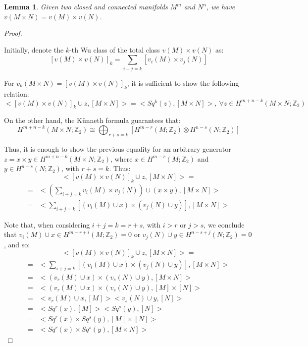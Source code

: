 \documentclass[12pt,oneside]{book}
\newtheorem{lem}    {Lemma}[chapter]
\newcommand{\Z}{\mathbb{Z}}
\begin{document}
    \begin{lem}
        Given two closed and connected manifolds $M^{m}$ and $N^{n}$, we have $v(M\times N)=v(M)\times v(N)$.
    \end{lem}
    \begin{proof}
    
    \
    
    Initially, denote the $k$-th Wu class of the total class $v(M)\times v(N)$ as:
    $$ [v(M)\times v(N)]_{k}=\sum_{i+j=k}\left[ v_{i}(M)\times v_{j}(N)\right] $$
    
    For $v_{k}(M\times N)=[v(M)\times v(N)]_{k}$, it is sufficient to show the following relation:
    $$ <[v(M)\times v(N)]_{k}\cup z,[M\times N]>=<Sq^{k}(z),[M\times N]>, \ \forall z\in H^{m+n-k}(M\times N;\Z_{2}) $$
    
    On the other hand, the Künneth formula guarantees that:
    $$ H^{m+n-k}(M\times N;\Z_{2})\cong \bigoplus_{r+s=k}\left[ H^{m-r}(M;\Z_{2})\otimes H^{n-s}(N;\Z_{2})\right] $$
    
    Thus, it is enough to show the previous equality for an arbitrary generator $z=x\times y\in H^{m+n-k}(M\times N;\Z_{2})$, where 
    $x\in H^{m-r}(M;\Z_{2})$ and $y\in H^{n-s}(N;\Z_{2})$, with $r+s=k$. Thus:
    \[
    <[v(M)\times v(N)]_{k}\cup z,[M\times N]> = 
    \]
    \[
    \begin{array}{rl}
        = & <\left( \sum_{i+j=k}v_{i}(M)\times v_{j}(N) \right) \cup (x\times y),[M\times N]> \\
        = & <\sum_{i+j=k}\left[ (v_{i}(M)\cup x)\times( v_{j}(N)\cup y) \right],[M\times N]>
    \end{array}
    \]
    
    Note that, when considering $i+j=k=r+s$, with $i>r$ or $j>s$, we conclude that $v_{i}(M)\cup x\in H^{m-r+i}(M;\Z_{2})=0$ or 
    $v_{j}(N)\cup y\in H^{n-s+j}(N;\Z_{2})=0$, and so:
    \[
    <[v(M)\times v(N)]_{k}\cup z,[M\times N]> = 
    \]
    \[
    \begin{array}{rl}
        = & <\sum_{i+j=k}[(v_{i}(M)\cup x)\times( v_{j}(N)\cup y)],[M\times N]> \\
        = & <(v_{r}(M)\cup x)\times (v_{s}(N)\cup y),[M\times N]> \\
        = & <(v_{r}(M)\cup x)\times (v_{s}(N)\cup y),[M]\times [N]> \\
        = & <v_{r}(M)\cup x,[M]><v_{s}(N)\cup y,[N]> \\
        = & <Sq^{r}(x),[M]><Sq^{s}(y),[N]> \\
        = & <Sq^{r}(x)\times Sq^{s}(y),[M]\times [N]> \\
        = & <Sq^{r}(x)\times Sq^{s}(y),[M\times N]>
    \end{array}
    \]
    

\end{proof}
\end{document}
